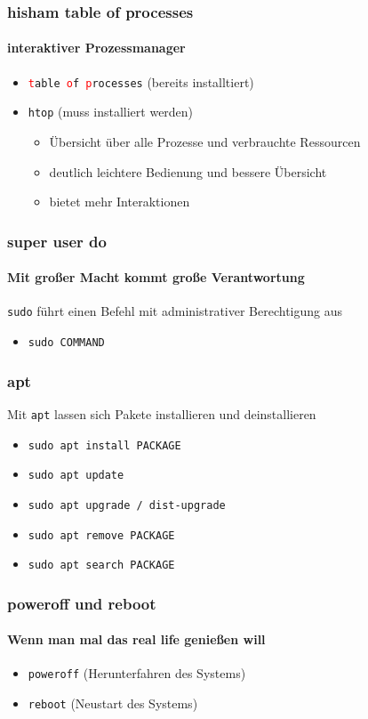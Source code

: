 \documentclass[12pt,utf8]{beamer}
\begin{document}
\begin{frame}
\Huge\centering{\&}
\end{frame}

\begin{frame}
\frametitle{\textcolor{FOSSAGalert}{h}isham \textcolor{FOSSAGalert}{t}able \textcolor{FOSSAGalert}{o}f \textcolor{FOSSAGalert}{p}rocesses}
\framesubtitle{interaktiver Prozessmanager}
\begin{itemize}
	\item \texttt{\textcolor{red}{t}able \textcolor{red}{o}f \textcolor{red}{p}rocesses} (bereits installtiert)
	\item \texttt{htop} (muss installiert werden)
	\begin{itemize}[<+->]
		\item {\scriptsize Übersicht über alle Prozesse und verbrauchte Ressourcen}
		\item {\scriptsize deutlich leichtere Bedienung und bessere Übersicht}
		\item {\scriptsize bietet mehr Interaktionen}
	\end{itemize}
\end{itemize}
\end{frame}

\begin{frame}
	\frametitle{\textcolor{FOSSAGalert}{s}uper \textcolor{FOSSAGalert}{u}ser \textcolor{FOSSAGalert}{do}}
	\framesubtitle{Mit großer Macht kommt große Verantwortung}
	\texttt{sudo} führt einen Befehl mit administrativer Berechtigung aus
	\begin{itemize}
		\item \texttt{sudo COMMAND}
	\end{itemize}
\end{frame}

\begin{frame}
	\frametitle{apt}
	Mit \texttt{apt} lassen sich Pakete installieren und deinstallieren
	\begin{itemize}
		\item \texttt{sudo apt install PACKAGE}
		\item \texttt{sudo apt update}
		\item \texttt{sudo apt upgrade / dist-upgrade}
		\item \texttt{sudo apt remove PACKAGE}
		\item \texttt{sudo apt search PACKAGE}
	\end{itemize}
\end{frame}

\begin{frame}
\frametitle{poweroff und reboot}
\framesubtitle{Wenn man mal das real life genießen will}
\begin{itemize}
	\item \texttt{poweroff} (Herunterfahren des Systems)
	\item \texttt{reboot} (Neustart des Systems)
\end{itemize}
\end{frame}
\end{document}
